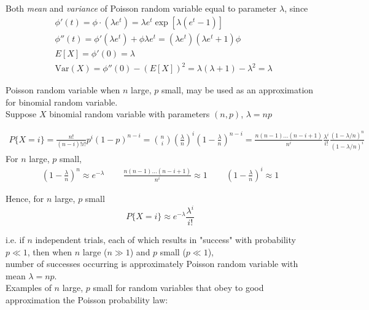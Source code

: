 Both \emph{mean} and \emph{variance} of Poisson random variable equal to parameter $\lambda$, since
\[
\begin{aligned}
	& \phi'(t) = \phi \cdot (\lambda e^t) = \lambda e^t \exp{ [\lambda ( e^t - 1)]} \\
	& \phi''(t) = \phi' (\lambda e^t ) + \phi \lambda e^t = (\lambda e^t) (\lambda e^t + 1 ) \phi \\
	& E[X] = \phi'(0) = \lambda \\
	& \text{Var}(X) = \phi''(0) - (E[X])^2 = \lambda ( \lambda + 1 ) - \lambda^2 = \lambda
\end{aligned}
\]

Poisson random variable when $n$ large, $p$ small, may be used as an approximation for binomial random variable. \\
Suppose $X$ binomial random variable with parameters $(n, p)$, $\lambda = np$

\[
\begin{gathered}
	P \lbrace X = i \rbrace = \frac{ n!}{ (n-i)! i!} p^i (1- p)^{n- i} = \binom{n}{i} \left( \frac{\lambda}{n} \right)^i \left( 1 - \frac{\lambda}{n} \right)^{n-i} = \frac{ n (n-1) \dots (n- i + 1) }{n^i } \frac{\lambda^i }{i!} \frac{ ( 1 - \lambda / n )^n }{ (1 - \lambda / n)^i}
\end{gathered}
\]
For $n$ large, $p$ small, 
\[
\begin{gathered}
	\left( 1 - \frac{ \lambda}{n} \right)^n \approx e^{-\lambda} \quad \quad \, \frac{ n (n- 1 ) \dots (n- i + 1) }{n^i } \approx 1 \quad \quad \, \left( 1 - \frac{\lambda}{n} \right)^i \approx 1
\end{gathered}
\]

Hence, for $n$ large, $p$ small
\begin{equation}
	P\lbrace X = i \rbrace \approx e^{-\lambda} \frac{\lambda^i}{i!}
\end{equation}

i.e. if $n$ independent trials, each of which results in "success" with probability $p \ll 1$, then when $n$ large ($n \gg 1$) and $p$ small ($p \ll 1$), \\
number of successes occurring is approximately Poisson random variable with mean $\lambda = np$. \\

Examples of $n$ large, $p$ small for random variables that obey to good approximation the Poisson probability law:


